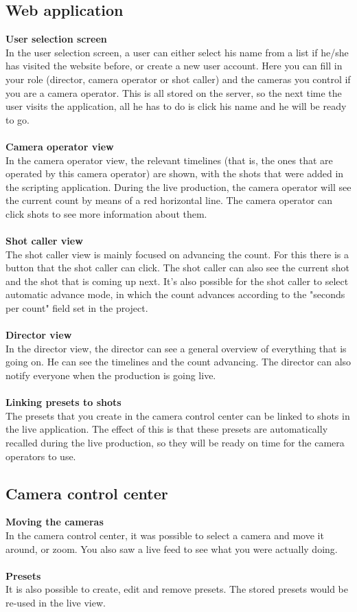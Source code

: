 \subsection*{Web application}
\textbf{User selection screen}\\
In the user selection screen, a user can either select his name from a list if he/she has visited the website before, or create a new user account. Here you can fill in your role (director, camera operator or shot caller) and the cameras you control if you are a camera operator. This is all stored on the server, so the next time the user visits the application, all he has to do is click his name and he will be ready to go.\\\\
\textbf{Camera operator view}\\
In the camera operator view, the relevant timelines (that is, the ones that are operated by this camera operator) are shown, with the shots that were added in the scripting application. During the live production, the camera operator will see the current count by means of a red horizontal line. The camera operator can click shots to see more information about them.\\\\
\textbf{Shot caller view}\\
The shot caller view is mainly focused on advancing the count. For this there is a button that the shot caller can click. The shot caller can also see the current shot and the shot that is coming up next. It's also possible for the shot caller to select automatic advance mode, in which the count advances according to the "seconds per count" field set in the project.\\\\
\textbf{Director view}\\
In the director view, the director can see a general overview of everything that is going on. He can see the timelines and the count advancing. The director can also notify everyone when the production is going live.\\\\
\textbf{Linking presets to shots}\\
The presets that you create in the camera control center can be linked to shots in the live application. The effect of this is that these presets are automatically recalled during the live production, so they will be ready on time for the camera operators to use.

\subsection*{Camera control center}
\textbf{Moving the cameras}\\
In the camera control center, it was possible to select a camera and move it around, or zoom. You also saw a live feed to see what you were actually doing.\\\\
\textbf{Presets}\\
It is also possible to create, edit and remove presets. The stored presets would be re-used in the live view.\\\\

